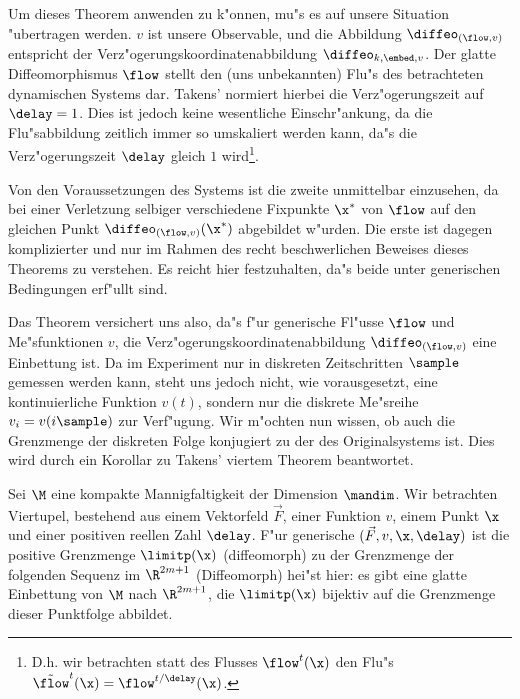 Um dieses Theorem anwenden zu k"onnen, mu"s es auf unsere Situation "ubertragen werden.
$v$ ist unsere Observable, und die Abbildung $\diffeo_{(\flow,v)}$ entspricht der
Verz"ogerungskoordinatenabbildung $\diffeo_{k,\embed,v}$.  Der glatte Diffeomorphismus
$\flow$ stellt den (uns unbekannten) Flu"s des betrachteten dynamischen Systems dar.
Takens' normiert hierbei die Verz"ogerungszeit auf $\delay=1$.  Dies ist jedoch keine
wesentliche Einschr"ankung, da die Flu"sabbildung zeitlich immer so umskaliert werden
kann, da"s die Verz"ogerungszeit $\delay$ gleich $1$ wird\footnote{D.h. wir betrachten
  statt des Flusses $\flow^t(\x)$ den Flu"s $\tilde\flow^{t}(\x) = \flow^{t/\delay}(\x)$.}.

Von den Voraussetzungen des Systems ist die zweite unmittelbar einzusehen, da bei einer
Verletzung selbiger verschiedene Fixpunkte $\x^*$ von $\flow$ auf den gleichen Punkt
$\diffeo_{(\flow,v)}(\x^*)$ abgebildet w"urden. Die erste ist dagegen komplizierter und
nur im Rahmen des recht beschwerlichen Beweises dieses Theorems zu verstehen. Es reicht
hier festzuhalten, da"s beide unter generischen Bedingungen erf"ullt sind.

Das Theorem versichert uns also, da"s f"ur generische Fl"usse $\flow$ und
Me"sfunktionen $v$, die Verz"ogerungskoordinatenabbildung $\diffeo_{(\flow,v)}$ eine
Einbettung ist. Da im Experiment nur in diskreten Zeitschritten $\sample$ gemessen werden
kann, steht uns jedoch nicht, wie vorausgesetzt, eine kontinuierliche Funktion $v(t)$,
sondern nur die diskrete Me"sreihe $v_i=v(i\sample)$ zur Verf"ugung. Wir m"ochten nun
wissen, ob auch die Grenzmenge der diskreten Folge konjugiert zu der des Originalsystems
ist. Dies wird durch ein Korollar zu Takens' viertem Theorem beantwortet.

\begin{corollar}
Sei $\M$ eine kompakte Mannigfaltigkeit der Dimension $\mandim$. Wir betrachten Viertupel,
bestehend aus einem Vektorfeld $\vec F$, einer Funktion $v$, einem Punkt $\x$ und einer
positiven reellen Zahl $\delay$. F"ur generische $(\vec F, v, \x, \delay)$ ist die
positive Grenzmenge $\limitp(\x)$ \naja(diffeomorph) zu der Grenzmenge der folgenden
Sequenz im $\R^{2m+1}$
\naja(Diffeomorph) hei"st hier: es gibt eine glatte Einbettung von $\M$ nach $\R^{2m+1}$,
die $\limitp(\x)$ bijektiv auf die Grenzmenge dieser Punktfolge abbildet.
\end{corollar}

